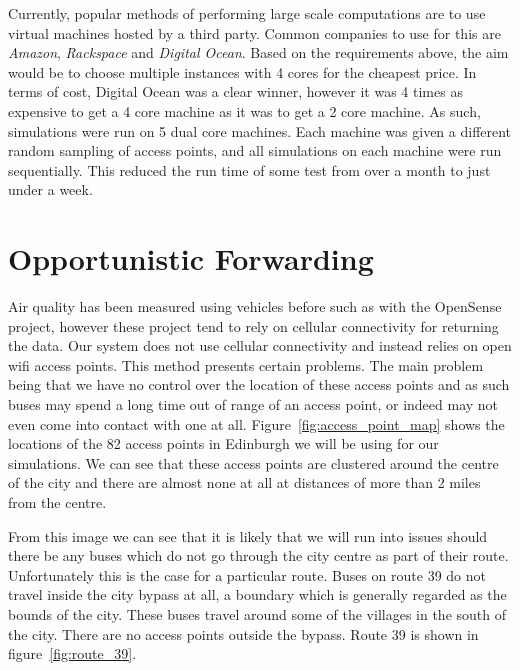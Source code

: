             Currently, popular methods of performing large scale computations are to use virtual machines hosted by a third party.  Common companies to use for this are \emph{Amazon}, \emph{Rackspace} and \emph{Digital Ocean}. Based on the requirements above, the aim would be to choose multiple instances with 4 cores for the cheapest price. In terms of cost, Digital Ocean was a clear winner, however it was 4 times as expensive to get a 4 core machine as it was to get a 2 core machine. As such, simulations were run on 5 dual core machines. Each machine was given a different random sampling of access points, and all simulations on each machine were run sequentially. This reduced the run time of some test from over a month to just under a week. 


    \section{Opportunistic Forwarding}\label{simulation_opportunistic_forwarding}


        Air quality has been measured using vehicles before such as with the OpenSense project, however these project tend to rely on cellular connectivity for returning the data. Our system does not use cellular connectivity and instead relies on open wifi access points. This method presents certain problems. The main problem being that we have no control over the location of these access points and as such buses may spend a long time out of range of an access point, or indeed may not even come into contact with one at all. Figure~\ref{fig:access_point_map} shows the locations of the 82 access points in Edinburgh we will be using for our simulations. We can see that these access points are clustered around the centre of the city and there are almost none at all at distances of more than 2 miles from the centre. 


        From this image we can see that it is likely that we will run into issues should there be any buses which do not go through the city centre as part of their route. Unfortunately this is the case for a particular route. Buses on route 39 do not travel inside the city bypass at all, a boundary which is generally regarded as the bounds of the city. These buses travel around some of the villages in the south of the city. There are no access points outside the bypass. Route 39 is shown in figure~\ref{fig:route_39}.

